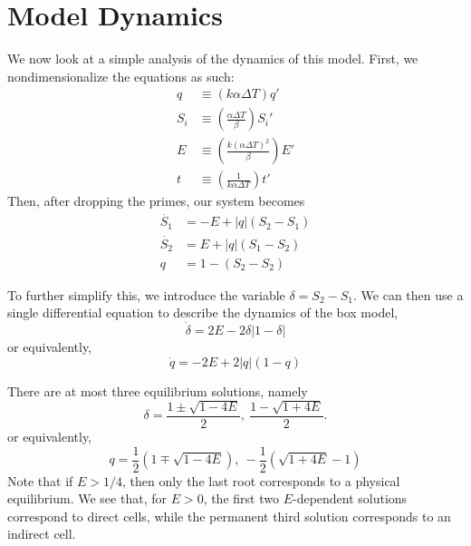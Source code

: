 \documentclass[letterpaper, 11pt]{article}
\begin{document}

\section{Model Dynamics}

We now look at a simple analysis of the dynamics of this model. First, we nondimensionalize the equations as such:
\begin{subequations}
\begin{align*}
q &\equiv \left(k \alpha \Delta T\right) q' \\
S_i &\equiv \left(\frac{\alpha \Delta T}{\beta}\right) S_i' \\
E &\equiv \left(\frac{k (\alpha \Delta T)^2}{\beta}\right) E' \\
t &\equiv \left(\frac{1}{k \alpha \Delta T}\right) t'
\end{align*}
\end{subequations}
Then, after dropping the primes, our system becomes
\begin{subequations}
\begin{align}
\dot{S_1} &= -E + |q|(S_2 - S_1) \\
\dot{S_2} &=  E + |q|(S_1 - S_2) \\
q &= 1 - (S_2 - S_2)
\end{align}
\end{subequations}

To further simplify this, we introduce the variable $\delta = S_2 - S_1$. We can then use a single differential equation to describe the dynamics of the box model,
\begin{equation}
\dot{\delta} = 2E - 2 \delta |1 - \delta|
\end{equation}
or equivalently,
\begin{equation}
\dot{q} = -2 E + 2 |q| (1 - q)
\end{equation}

There are at most three equilibrium solutions, namely
\begin{equation}
\delta = \frac{1 \pm \sqrt{1 - 4E}}{2}, \ \frac{1 - \sqrt{1 + 4E}}{2}.
\end{equation}
or equivalently,
\begin{equation}
q = \frac{1}{2} (1 \mp \sqrt{1 - 4E}), \ -\frac{1}{2} (\sqrt{1 + 4E} - 1)
\end{equation}
Note that if $E > 1/4$, then only the last root corresponds to a physical equilibrium. We see that, for $E > 0$, the first two $E$-dependent solutions correspond to direct cells, while the permanent third solution corresponds to an indirect cell.
\end{document}

